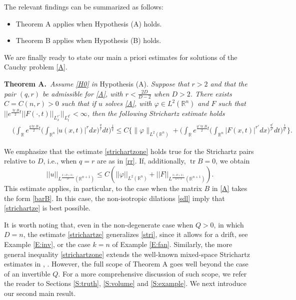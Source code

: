 \documentclass[11pt,letter]{amsart}
\def \R {\mathbb{R}}
\def \vf{\varphi}
\newcommand{\Rn}{\mathbb R^n}
\numberwithin{equation}{section}
\newcommand{\tr}{\operatorname{tr}}
\numberwithin{equation}{section}
\begin{document}
The relevant findings can be summarized as follows:
\begin{itemize}
\item[(a)] Theorem A applies when Hypothesis (A) holds.
\item[(b)] Theorem B applies when Hypothesis (B) holds.
\end{itemize}

\vskip 0.2in


\noindent We are finally ready to state our main a priori estimates for solutions of the Cauchy problem \eqref{A}. 

\vskip 0.2in

\noindent \textbf{Theorem A.}\label{T:strichartzone}\ 
\emph{Assume \eqref{H0} in} Hypothesis (A). \emph{Suppose that $r>2$ and that the pair $(q,r)$ be admissible for \eqref{A}, with $r < \frac{2D}{D-2}$ when $D> 2$. There exists $C = C(n,r)>0$ such that if $u$ solves \eqref{A}, with $\vf\in L^2(\Rn)$ and $F$ such that $||e^{\frac{\tr B}{2} t} ||F(\cdot,t)||_{L^{r'}_x}||_{L^{q'}_t}<\infty$, then the following Strichartz estimate holds}
\begin{align}\label{strichartzone}
& \bigg(\int_\R e^{\frac{q\tr B}2 t} \big(\int_{\Rn}|u(x,t)|^r dx\big)^{\frac qr} dt\bigg)^{\frac 1q} \le C \bigg\{\|\vf\|_{L^2(\Rn)}
 + \bigg(\int_\R e^{\frac{q' \tr B}2 t} \big(\int_{\Rn}|F(x,t)|^{r'} dx\big)^{\frac{q'}{r'}} dt\bigg)^{\frac 1{q'}}\bigg\}.
\end{align}

\vskip 0.2in

\noindent We emphasize that the estimate \eqref{strichartzone} holds true for the Strichartz pairs relative to $D$, i.e., when $q=r$ are as in \eqref{rr}. If, additionally, $\tr B = 0$, we obtain 
\begin{equation}\label{strichartze}
||u||_{L^{\frac{2(D+2)}D}(\R^{n+1})} \le C \left(||\vf||_{L^2(\Rn)} + ||F||_{L^{\frac{2(D+2)}{D+4}}(\R^{n+1})}\right).
\end{equation}
This estimate applies, in particular, to the case when the matrix $B$ in \eqref{A} takes the form \eqref{barB}. In this case, the non-isotropic dilations \eqref{sdl} imply that \eqref{strichartze} is best possible.

It is worth noting that, even in the non-degenerate case when $Q>0$, in which $D=n$, the estimate \eqref{strichartze} generalizes \eqref{stri}, since it allows for a drift, see Example \ref{E:inv}, or the case $k=n$ of Example \ref{E:fan}. Similarly, the more general inequality \eqref{strichartzone} extends the well-known mixed-space Strichartz estimates  in \cite{GVstrich}, \cite{Caze}. However, the full scope of Theorem A goes well beyond the case of an invertible $Q$. For a more comprehensive discussion of such scope, we refer the reader to Sections \ref{S:truth}, \ref{S:volume} and \ref{S:example}. We next introduce our second main result.
\end{document}

